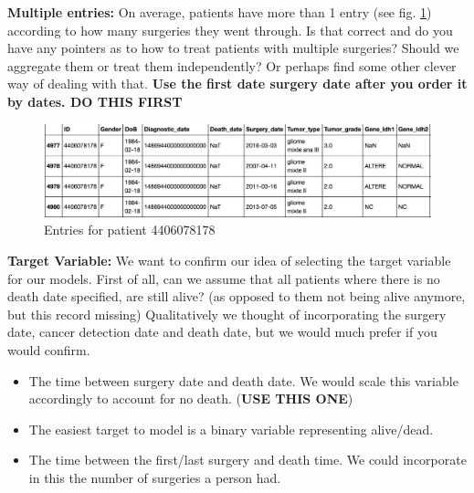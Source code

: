 \documentclass[a4paper]{article}
\begin{document}
%
\textbf{Multiple entries:} On average, patients have more than 1 entry (see fig. \ref{fig:m_entries}) according to how many surgeries they went through. Is that correct and do you have any pointers as to how to treat patients with multiple surgeries? Should we aggregate them or treat them independently? Or perhaps find some other clever way of dealing with that. \textbf{Use the first date surgery date after you order it by dates.  DO THIS FIRST}
\begin{figure}[H]
\centering
\includegraphics[width=1.0\linewidth]{images/multiple_entries.png}
\caption{Entries for patient 4406078178}
\label{fig:m_entries}
\end{figure}
% 
\textbf{Target Variable:}
We want to confirm our idea of selecting the target variable for our models. 
First of all, can we assume that all patients where there is no death date specified, are still alive? (as opposed to them not being alive anymore, but this record missing)
Qualitatively we thought of incorporating the surgery date, cancer detection date and death date, but we would much prefer if you would confirm. 
\begin{itemize}
\item The time between surgery date and death date. We would scale this variable accordingly to account for no death. (\textbf{USE THIS ONE})
\item The easiest target to model is a binary variable representing alive/dead.
\item The time between the first/last surgery and death time. We could incorporate in this the number of surgeries a person had. 
\end{itemize}
%
%
%
\end{document}
